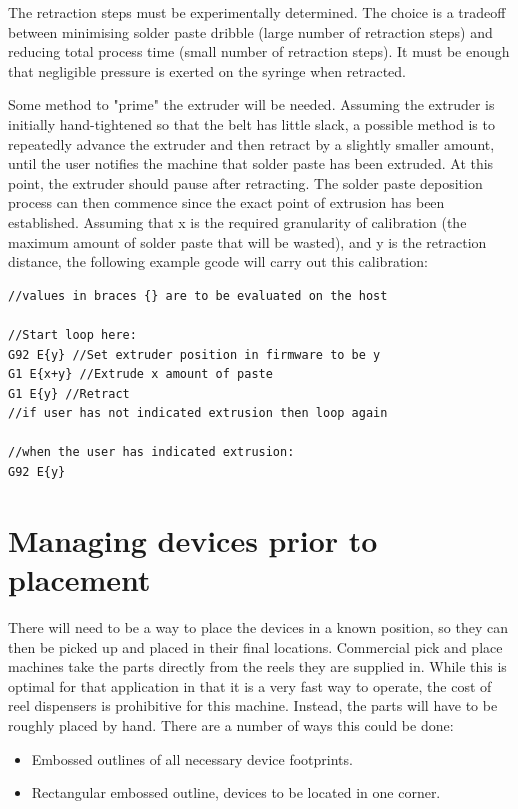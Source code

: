 \documentclass[a4paper,11pt]{article}  %
\begin{document}
The retraction steps must be experimentally determined. The choice is a tradeoff between minimising solder paste dribble (large number
of retraction steps) and reducing total process time (small number of retraction steps). It must be enough that negligible pressure is
exerted on the syringe when retracted.

Some method to "prime" the extruder will be needed. Assuming the extruder is initially hand-tightened so that the belt has little slack,
a possible method is to repeatedly advance the extruder and then retract by a slightly smaller amount, until the user notifies the machine
that solder paste has been extruded. At this point, the extruder should pause after retracting. The solder paste deposition process can
then commence since the exact point of extrusion has been established. Assuming that x is the required granularity of calibration (the 
maximum amount of solder paste that will be wasted), and y is the retraction distance, the following example gcode will carry out this calibration:

\begin{lstlisting}[frame=single]
//values in braces {} are to be evaluated on the host

//Start loop here:
G92 E{y} //Set extruder position in firmware to be y
G1 E{x+y} //Extrude x amount of paste
G1 E{y} //Retract
//if user has not indicated extrusion then loop again

//when the user has indicated extrusion:
G92 E{y}
\end{lstlisting}
	  
\section{Managing devices prior to placement}
There will need to be a way to place the devices in a known position, so they can then be picked up and placed in their final locations.
Commercial pick and place machines take the parts directly from the reels they are supplied in. While this is optimal for that application in that
it is a very fast way to operate, the cost of reel dispensers is prohibitive for this machine. Instead, the parts will have to be roughly placed
by hand. There are a number of ways this could be done:

\begin{itemize} \itemsep0em
	\item	Embossed outlines of all necessary device footprints.
	\item	Rectangular embossed outline, devices to be located in one corner.
\end{itemize}
\end{document}
